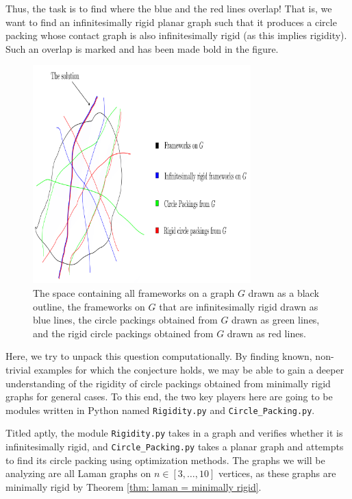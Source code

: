 \begin{flushleft}
Thus, the task is to find where the blue and the red lines overlap! That is, we want to find an infinitesimally rigid planar graph such that it produces a circle packing whose contact graph is also infinitesimally rigid (as this implies rigidity). Such an overlap is marked and has been made bold in the figure. 
\end{flushleft}

\begin{figure}[htbp]
    \centering
    \includegraphics[width = 0.75\textwidth]{Chapter 4/5. configuration space.png}
    \caption{The space containing all frameworks on a graph $G$ drawn as a black outline, the frameworks on $G$ that are infinitesimally rigid drawn as blue lines, the circle packings obtained from $G$ drawn as green lines, and the rigid circle packings obtained from $G$ drawn as red lines.}
    \label{fig4: config space} 
\end{figure}
\vspace{-4mm}
\begin{flushleft}
Here, we try to unpack this question computationally. By finding known, non-trivial examples for which the conjecture holds, we may be able to gain a deeper understanding of the rigidity of circle packings obtained from minimally rigid graphs for general cases. To this end, the two key players here are going to be modules written in Python named \texttt{Rigidity.py} and \texttt{Circle\_Packing.py}. 
\end{flushleft}

\begin{flushleft}
Titled aptly, the module \texttt{Rigidity.py} takes in a graph and verifies whether it is infinitesimally rigid, and \texttt{Circle\_Packing.py} takes a planar graph and attempts to find its circle packing using optimization methods. The graphs we will be analyzing are all Laman graphs on $n \in [3, \hdots, 10]$ vertices, as these graphs are minimally rigid by Theorem \ref{thm: laman = minimally rigid}.  
\end{flushleft}

